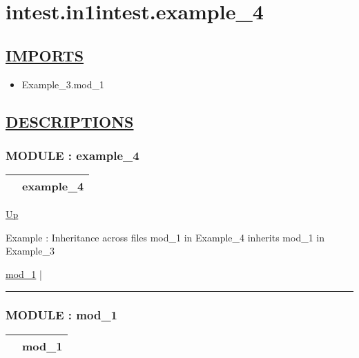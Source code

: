 \chapter*{intest.in1intest.example\_4}
\hypertarget{ecldoc:toc:intest.in1intest.example_4}{}

\section*{\underline{IMPORTS}}
\begin{itemize}
\item Example\_3.mod\_1
\end{itemize}

\section*{\underline{DESCRIPTIONS}}
\subsection*{MODULE : example\_4}
\hypertarget{ecldoc:intest.in1intest.example_4}{}

{\renewcommand{\arraystretch}{1.5}
\begin{tabularx}{\textwidth}{|>{\raggedright\arraybackslash}l|X|}
\hline
\hspace{0pt} & example\_4 \\
\hline
\end{tabularx}
}

\hyperlink{ecldoc:toc:intest/in1intest}{Up}

\par
Example : Inheritance across files mod\_1 in Example\_4 inherits mod\_1 in Example\_3


\hyperlink{ecldoc:intest.in1intest.example_4.mod_1}{mod\_1}  |

\rule{\textwidth}{0.4pt}

\subsection*{MODULE : mod\_1}
\hypertarget{ecldoc:intest.in1intest.example_4.mod_1}{}

{\renewcommand{\arraystretch}{1.5}
\begin{tabularx}{\textwidth}{|>{\raggedright\arraybackslash}l|X|}
\hline
\hspace{0pt} & mod\_1 \\
\hline
\end{tabularx}
}

